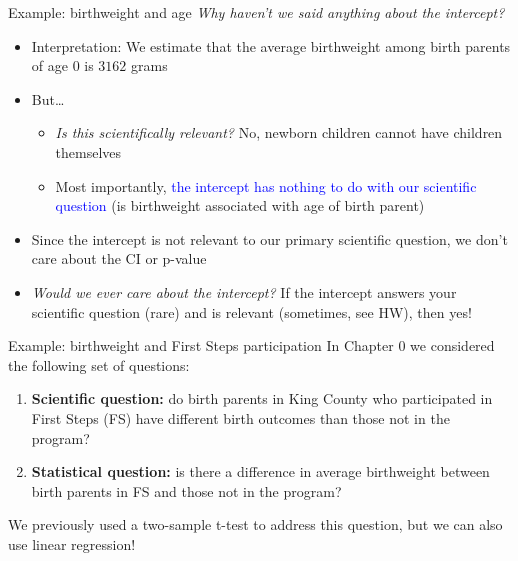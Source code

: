 \documentclass[10pt,t]{beamer}
\begin{document}
\begin{frame}{Example: birthweight and age}
\textit{Why haven't we said anything about the intercept?}
\vspace{0.3cm}
\begin{itemize}
	\item Interpretation: We estimate that the average birthweight among birth parents of age $0$ is $3162$ grams\pause
	\item But\dots 
	\begin{itemize}
		\item \textit{Is this scientifically relevant?} No, newborn children cannot have children themselves
		\item Most importantly, \textcolor{blue}{the intercept has nothing to do with our scientific question} (is birthweight associated with age of birth parent)
	\end{itemize} \pause
	\item Since the intercept is not relevant to our primary scientific question, we don't care about the CI or p-value\pause
	\item \textit{Would we ever care about the intercept?} If the intercept answers your scientific question (rare) and is relevant (sometimes, see HW), then yes!
\end{itemize}
\end{frame}

\begin{frame}{Example: birthweight and First Steps participation}
In Chapter 0 we considered the following set of questions:

\vspace{0.3cm}

\begin{enumerate}
	\item \textbf{Scientific question:} do birth parents in King County who participated in First Steps (FS) have different birth outcomes than those not in the program?
	\item \textbf{Statistical question:} is there a difference in average birthweight between birth parents in FS and those not in the program?
\end{enumerate}

\vspace{0.3cm} We previously used a two-sample t-test to address this question, but we can also use linear regression!

\end{frame}
\end{document}
